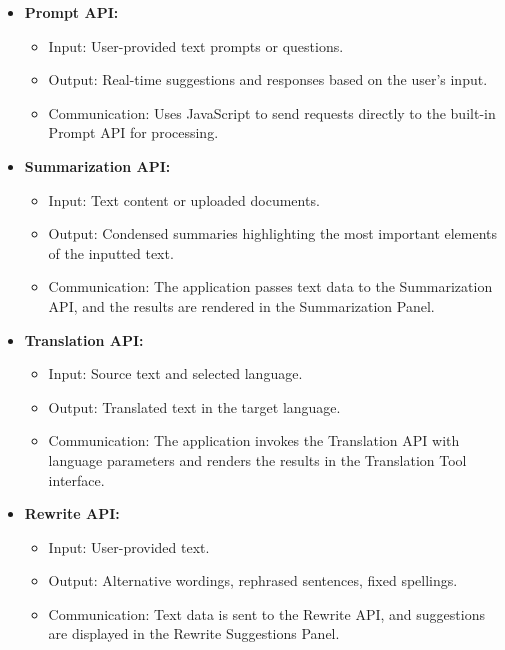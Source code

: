 \documentclass{article}
\begin{document}
\begin{itemize}
    \item \textbf{Prompt API:} 
    \begin{itemize}
        \item Input: User-provided text prompts or questions.
        \item Output: Real-time suggestions and responses based on the user's input.
        \item Communication: Uses JavaScript to send requests directly to the built-in Prompt API for processing.
    \end{itemize}
    
    \item \textbf{Summarization API:}
    \begin{itemize}
        \item Input: Text content or uploaded documents.
        \item Output: Condensed summaries highlighting the most important elements of the inputted text.
        \item Communication: The application passes text data to the Summarization API, and the results are rendered in the Summarization Panel.
    \end{itemize}
    
    \item \textbf{Translation API:}
    \begin{itemize}
        \item Input: Source text and selected language.
        \item Output: Translated text in the target language.
        \item Communication: The application invokes the Translation API with language parameters and renders the results in the Translation Tool interface.
    \end{itemize}

\item \textbf{Rewrite API:}
    \begin{itemize}
        \item Input: User-provided text.
        \item Output: Alternative wordings, rephrased sentences, fixed spellings.
        \item Communication: Text data is sent to the Rewrite API, and suggestions are displayed in the Rewrite Suggestions Panel.
    \end{itemize}
\end{itemize}
\end{document}
